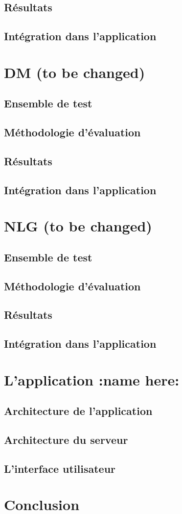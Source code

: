 	\subsection{Résultats}
	\subsection{Intégration dans l'application}

\section{DM (to be changed)}
	\subsection{Ensemble de test}
	\subsection{Méthodologie d'évaluation}
	\subsection{Résultats}
	\subsection{Intégration dans l'application}

\section{NLG (to be changed)}
	\subsection{Ensemble de test}
	\subsection{Méthodologie d'évaluation}
	\subsection{Résultats}
	\subsection{Intégration dans l'application}

\section{L'application :name here:}
	\subsection{Architecture de l'application}
	\subsection{Architecture du serveur}
	\subsection{L'interface utilisateur}


\section{Conclusion}

